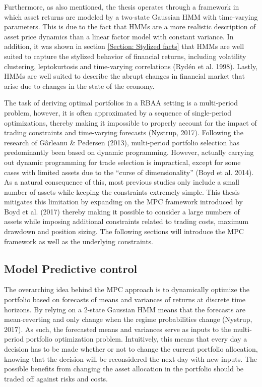 Furthermore, as also mentioned, the thesis operates through a framework in which asset returns are modeled by a two-state Gaussian HMM with time-varying parameters. This is due to the fact that HMMs are a more realistic description of asset price dynamics than a linear factor model with constant variance. In addition, it was shown in section \ref{Section: Stylized facts} that HMMs are well suited to capture the stylized behavior of financial returns, including volatility clustering, leptokurtosis and time-varying correlations (Rydén et al. 1998). Lastly, HMMs are well suited to describe the abrupt changes in financial market that arise due to changes in the state of the economy.   

The task of deriving optimal portfolios in a RBAA setting is a multi-period problem, however, it is often approximated by a sequence of single-period optimizations, thereby making it impossible to properly account for the impact of trading constraints and time-varying forecasts (Nystrup, 2017). Following the research of Gârleanu \& Pedersen (2013), multi-period portfolio selection has predominantly been based on dynamic programming. However, actually carrying out dynamic programming for trade selection is impractical, except for
some cases with limited assets due to the “curse of dimensionality” (Boyd et al. 2014). As a natural consequence of this, most previous studies only include a small number of assets while keeping the constraints extremely simple. This thesis mitigates this limitation by expanding on the MPC framework introduced by Boyd et al. (2017) thereby making it possible to consider a large numbers of assets while imposing additional constraints related to trading costs, maximum drawdown and position sizing. The following sections will introduce the MPC framework as well as the underlying constraints.

\subsection{Model Predictive control}
\label{Subsection: Model predictive control}

The overarching idea behind the MPC approach is to dynamically optimize the portfolio based on forecasts of means and variances of returns at discrete time horizons. By relying on a 2-state Gaussian HMM means that the forecasts are mean-reverting and
only change when the regime probabilities change (Nystrup, 2017). As such, the forecasted means and variances serve as inputs to the multi-period portfolio optimization problem. Intuitively, this means that every day a decision has to be made whether or not to change the current portfolio allocation, knowing that the decision will be reconsidered the next day with new inputs. The possible benefits from changing the asset allocation in the portfolio should be traded off against risks and costs. 

